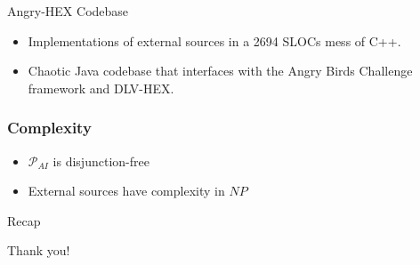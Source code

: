 \documentclass[smaller, dvipsnames]{beamer}
\newcommand{\ab}{Angry Birds\xspace}
\begin{document}
\begin{frame}{Angry-HEX Codebase}
	\begin{itemize}
		\item Implementations of external sources in a 2694 SLOCs mess of C++.
		\item Chaotic Java codebase that interfaces with the \ab Challenge {framework} and DLV-HEX.
	\end{itemize}
\end{frame}

\begin{frame}
	\frametitle{Complexity}
	\begin{itemize}
		\item \(\mathcal{P}_{AI}\) is \alert{disjunction-free}
		\item \alert{External sources} have complexity in \(NP\)
	\end{itemize}
\end{frame}

\begin{frame}{Recap}
    \tableofcontents
\end{frame}

\begin{frame}[standout]
    Thank you!
\end{frame}
\end{document}
